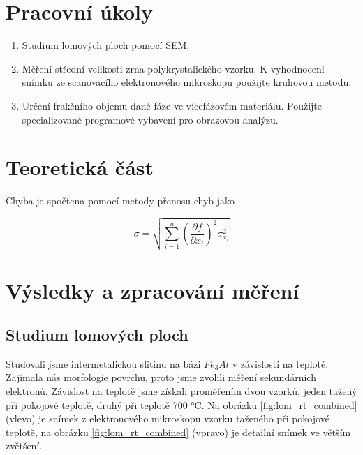 \section{Pracovní úkoly}

\begin{enumerate}
\item Studium lomových ploch pomocí SEM.

\item Měření střední velikosti zrna polykrystalického vzorku. K vyhodnocení snímku ze scanovacího elektronového mikroskopu použijte kruhovou metodu.

\item Určení frakčního objemu dané fáze ve vícefázovém materiálu. Použijte specializované programové vybavení pro obrazovou analýzu.
\end{enumerate}

\section{Teoretická část}

Chyba je spočtena pomocí metody přenosu chyb \cite{bib:metoda-prenosu-chyb} jako

\begin{equation}
    \sigma = \sqrt{\sum^n_{i=1} \left( \frac{\partial f}{\partial x_i} \right)^2 \sigma^2_{x_i}}
\end{equation}

\section{Výsledky a zpracování měření}

\subsection{Studium lomových ploch}

Studovali jsme intermetalickou slitinu na bázi $Fe_3Al$ v závislosti na teplotě. Zajímala nás morfologie povrchu, proto jsme zvolili měření sekundárních elektronů. Závislost na teplotě jsme získali proměřením dvou vzorků, jeden tažený při pokojové teplotě, druhý při teplotě 700 °C. Na obrázku \ref{fig:lom_rt_combined} (vlevo) je snímek z elektronového mikroskopu vzorku taženého při pokojové teplotě, na obrázku \ref{fig:lom_rt_combined} (vpravo) je detailní snímek ve větším zvětšení. 

